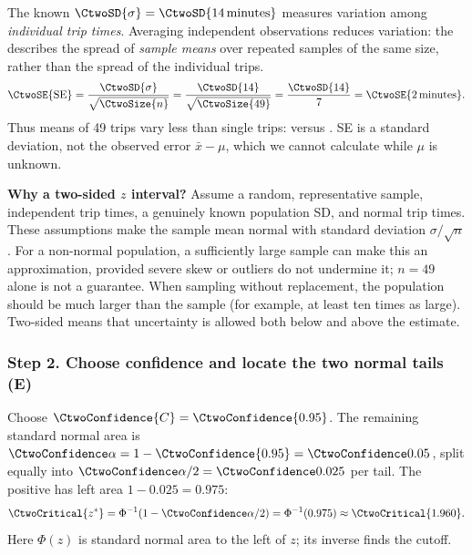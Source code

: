 The known 
$\CtwoSD{\sigma}=\CtwoSD{14\,\text{minutes}}$ measures variation among
\emph{individual trip times}. Averaging independent observations reduces variation:
the  describes the spread of \emph{sample means} over
repeated samples of the same size, rather than the spread of the individual trips.
\[
\CtwoSE{\mathrm{SE}}=\frac{\CtwoSD{\sigma}}{\sqrt{\CtwoSize{n}}}
=\frac{\CtwoSD{14}}{\sqrt{\CtwoSize{49}}}
=\frac{\CtwoSD{14}}{7}=\CtwoSE{2\,\text{minutes}}.
\]
Thus means of 49 trips vary less than single trips:  versus
. SE is a standard deviation, not the observed error
$\bar{x}-\mu$, which we cannot calculate while $\mu$ is unknown.

\textbf{Why a two-sided $z$ interval?} Assume a random, representative sample,
independent trip times, a genuinely known population SD, and normal trip times.
These assumptions make the sample mean normal with standard deviation
$\sigma/\sqrt n$. For a non-normal population, a sufficiently large sample can
make this an approximation, provided severe skew or outliers do not undermine it;
$n=49$ alone is not a guarantee. When sampling without replacement, the population
should be much larger than the sample (for example, at least ten times as large).
Two-sided means that uncertainty is allowed both below and above the estimate.

\subsubsection*{Step 2. Choose confidence and locate the two normal tails (E)}
Choose  $\CtwoConfidence{C}=\CtwoConfidence{0.95}$.
The remaining standard normal area is
$\CtwoSignificance{\alpha}=1-\CtwoConfidence{0.95}=\CtwoSignificance{0.05}$,
split equally into $\CtwoSignificance{\alpha}/2=\CtwoSignificance{0.025}$ per tail.
The positive  has left area $1-0.025=0.975$:
\[
\CtwoCritical{z^*}=\Phi^{-1}(1-\CtwoSignificance{\alpha}/2)
=\Phi^{-1}(0.975)\approx\CtwoCritical{1.960}.
\]
Here $\Phi(z)$ is standard normal area to the left of $z$; its inverse finds the cutoff.

